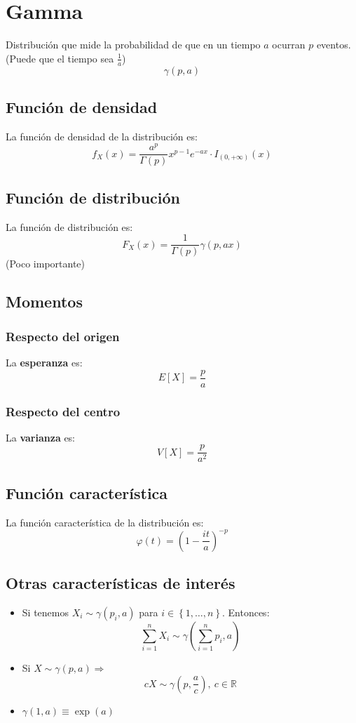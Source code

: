 \section{Gamma}
\label{sec:gamma}
Distribución que mide la probabilidad de que en un tiempo $a$ ocurran $p$ eventos. (Puede que el tiempo sea $\frac{1}{a}$)
\[
\boxed{\gamma\left( p, a \right)}
\]

\subsection{Función de densidad}
La función de densidad de la distribución es:
\[
f_X \left( x \right) = \frac{a^p}{\Gamma\left( p \right)} x^{p - 1} e^{-ax} \cdot I_{\left( 0, +\infty \right)} \left( x \right)
\]

\subsection{Función de distribución}
La función de distribución es:
\[
F_X\left( x \right) = \frac{1}{\Gamma\left( p \right)} \gamma\left( p, ax \right)
\]
(Poco importante)

\subsection{Momentos}

\subsubsection*{Respecto del origen}
La \textbf{esperanza} es: 
\[
    E\left[ X \right] = \frac{p}{a}
\]
\subsubsection*{Respecto del centro}
La \textbf{varianza} es:
\[
    V\left[ X \right] = \frac{p}{a^2}
\]

\subsection{Función característica}
La función característica de la distribución es:
\[
\varphi\left( t \right) = \left( 1 - \frac{it}{a} \right)^{-p}
\]

\subsection{Otras características de interés}
\begin{itemize}
    \item Si tenemos $X_i \sim \gamma\left( p_i, a \right)$ para $i \in \left\{ 1, \ldots, n \right\}$. Entonces:
    \[
    \sum_{i=1}^{n} X_i \sim \gamma\left( \sum_{i=1}^{n} p_i, a \right) 
    \]
    \item Si $X \sim \gamma\left( p, a \right) \Rightarrow$
    \[
    c X \sim \gamma\left( p, \frac{a}{c} \right),\ c \in \mathbb{R}
    \]
    \item $\gamma\left( 1, a \right) \equiv \exp\left( a \right)$
\end{itemize}
